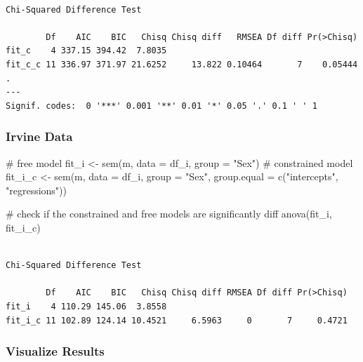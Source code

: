 \documentclass[
  letterpaper,
  DIV=11,
  numbers=noendperiod]{scrartcl}
\newenvironment{Shaded}{\begin{snugshade}}{\end{snugshade}}
\newcommand{\AttributeTok}[1]{\textcolor[rgb]{0.40,0.45,0.13}{#1}}
\newcommand{\CommentTok}[1]{\textcolor[rgb]{0.37,0.37,0.37}{#1}}
\newcommand{\FunctionTok}[1]{\textcolor[rgb]{0.28,0.35,0.67}{#1}}
\newcommand{\NormalTok}[1]{\textcolor[rgb]{0.00,0.23,0.31}{#1}}
\newcommand{\OtherTok}[1]{\textcolor[rgb]{0.00,0.23,0.31}{#1}}
\newcommand{\StringTok}[1]{\textcolor[rgb]{0.13,0.47,0.30}{#1}}
\begin{document}
\begin{verbatim}

Chi-Squared Difference Test

        Df    AIC    BIC   Chisq Chisq diff   RMSEA Df diff Pr(>Chisq)  
fit_c    4 337.15 394.42  7.8035                                        
fit_c_c 11 336.97 371.97 21.6252     13.822 0.10464       7    0.05444 .
---
Signif. codes:  0 '***' 0.001 '**' 0.01 '*' 0.05 '.' 0.1 ' ' 1
\end{verbatim}

\hypertarget{irvine-data}{%
\subsubsection{Irvine Data}\label{irvine-data}}

\begin{Shaded}
\begin{Highlighting}[]
\CommentTok{\# free model}
\NormalTok{fit\_i }\OtherTok{\textless{}{-}} \FunctionTok{sem}\NormalTok{(m, }\AttributeTok{data =}\NormalTok{ df\_i, }\AttributeTok{group =} \StringTok{"Sex"}\NormalTok{)}
\CommentTok{\# constrained model}
\NormalTok{fit\_i\_c }\OtherTok{\textless{}{-}} \FunctionTok{sem}\NormalTok{(m, }\AttributeTok{data =}\NormalTok{ df\_i, }\AttributeTok{group =} \StringTok{"Sex"}\NormalTok{,}
                \AttributeTok{group.equal =} \FunctionTok{c}\NormalTok{(}\StringTok{"intercepts"}\NormalTok{, }\StringTok{"regressions"}\NormalTok{))}
\end{Highlighting}
\end{Shaded}

\begin{Shaded}
\begin{Highlighting}[]
\CommentTok{\# check if the constrained and free models are significantly diff}
\FunctionTok{anova}\NormalTok{(fit\_i, fit\_i\_c)}
\end{Highlighting}
\end{Shaded}

\begin{verbatim}

Chi-Squared Difference Test

        Df    AIC    BIC   Chisq Chisq diff RMSEA Df diff Pr(>Chisq)
fit_i    4 110.29 145.06  3.8558                                    
fit_i_c 11 102.89 124.14 10.4521     6.5963     0       7     0.4721
\end{verbatim}

\hypertarget{visualize-results}{%
\subsubsection{Visualize Results}\label{visualize-results}}
\end{document}
